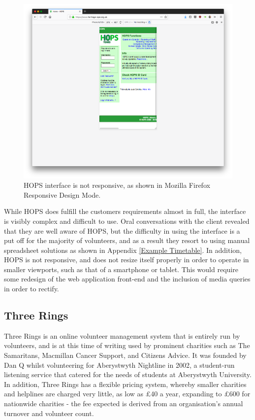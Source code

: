 \begin{figure}[!ht]
    \includegraphics[width=\textwidth]{Figures/hops-unresponsive}
    \caption{HOPS interface is not responsive, as shown in Mozilla Firefox Responsive Design Mode.}
    \label{fig:hops2}
\end{figure}

While HOPS does fulfill the customers requirements almost in full, the interface is visibly complex and difficult to use. Oral conversations with the client revealed that they are well aware of HOPS, but the difficulty in using the interface is a put off for the majority of volunteers, and as a result they resort to using manual spreadsheet solutions as shown in Appendix \ref{Example Timetable}. In addition, HOPS is not responsive, and does not resize itself properly in order to operate in smaller viewports, such as that of a smartphone or tablet. This would require some redesign of the web application front-end and the inclusion of media queries in order to rectify. \cite{6976522}

\subsection{Three Rings}

Three Rings is an online volunteer management system that is entirely run by volunteers, and is at this time of writing used by prominent charities such as The Samaritans, Macmillan Cancer Support, and Citizens Advice. \cite{3r1} It was founded by Dan Q whilst volunteering for Aberystwyth Nightline in 2002, a student-run listening service that catered for the needs of students at Aberystwyth University. \cite{Q1} \cite{AberNL1} In addition, Three Rings has a flexible pricing system, whereby smaller charities and helplines are charged very little, as low as £40 a year, expanding to £600 for nationwide charities - the fee expected is derived from an organisation's annual turnover and volunteer count. \cite{3r4}

